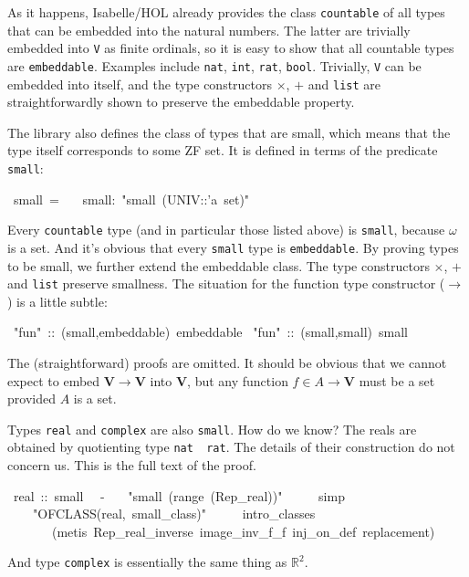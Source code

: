 \documentclass[runningheads]{llncs}
\newcommand{\V}{\mathbf{V}}
\begin{document}
As it happens, Isabelle/HOL already provides the class \texttt{countable} of all types that can be embedded into the natural numbers. The latter are trivially embedded into \texttt{V} as finite ordinals, so it is easy to show that all countable types are \texttt{embeddable}.
Examples include \texttt{nat}, \texttt{int}, \texttt{rat}, \texttt{bool}.
Trivially, \texttt{V} can be embedded into itself, and the type constructors $\times$, $+$ and \texttt{list} are straightforwardly shown to preserve the embeddable property.

The library also defines the class of types that are small, which means that the type itself corresponds to some ZF set. It is defined in terms of the predicate \texttt{small}:
\begin{isabelle}
\ small\ =\isanewline
\ \ \ small:\ "small\ (UNIV::'a\ set)"
\end{isabelle}

Every \texttt{countable} type (and in particular those listed above) is \texttt{small}, because $\omega$ is a set. And it's obvious that every \texttt{small} type is \texttt{embeddable}. By proving types to be small, we further extend the embeddable class.
The type constructors $\times$, $+$ and \texttt{list} preserve smallness.
The situation for the function type constructor ($\to$) is a little subtle:
\begin{isabelle}
\ "fun"\ ::\ (small,embeddable)\ embeddable\isanewline
{}\ "fun"\ ::\ (small,small)\ small\end{isabelle}
The (straightforward) proofs are omitted.
It should be obvious that we cannot expect to embed $\V\to\V$ into $\V$, but any function $f\in A\to\V$ must be a set provided $A$ is a set.

Types \texttt{real} and \texttt{complex} are also \texttt{small}. How do we know? The reals are obtained by quotienting type \texttt{nat \isasymRightarrow\ rat}. The details of their construction do not concern us.
This is the full text of the proof.
\begin{isabelle}
\ real\ ::\ small\ \isanewline
{}\ -\isanewline
\ \ \ "small\ (range\ (Rep\_real))"\isanewline
\ \ \ \ \ simp\isanewline
\ \ \ \ "OFCLASS(real,\ small\_class)"\isanewline
\ \ \ \ \ intro\_classes\isanewline
\ \ \ \ \ \ \ (metis\ Rep\_real\_inverse\ image\_inv\_f\_f\ inj\_on\_def\ replacement)\isanewline
{}
\end{isabelle}
And type \texttt{complex} is essentially the same thing as $\mathbb{R}^2$.
\end{document}

